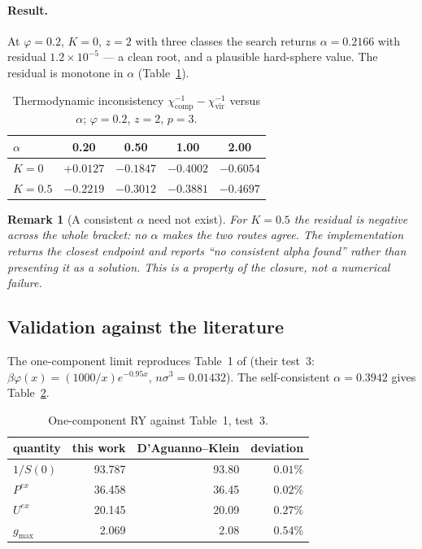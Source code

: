 \documentclass[11pt,a4paper]{article}
\newtheorem{remark}{Remark}
\begin{document}
\paragraph{Result.} At $\varphi=0.2$, $K=0$, $z=2$ with three classes the
search returns $\alpha=0.2166$ with residual $1.2\times10^{-5}$ --- a clean
root, and a plausible hard-sphere value. The residual is monotone in
$\alpha$ (Table~\ref{tab:alpha}).

\begin{table}[htbp]
\centering
\caption{Thermodynamic inconsistency
$\chi^{-1}_{\text{comp}}-\chi^{-1}_{\text{vir}}$ versus $\alpha$;
$\varphi=0.2$, $z=2$, $p=3$.}
\label{tab:alpha}
\begin{tabular}{lcccc}
\toprule
$\alpha$ & 0.20 & 0.50 & 1.00 & 2.00\\
\midrule
$K=0$   & $+0.0127$ & $-0.1847$ & $-0.4002$ & $-0.6054$\\
$K=0.5$ & $-0.2219$ & $-0.3012$ & $-0.3881$ & $-0.4697$\\
\bottomrule
\end{tabular}
\end{table}

\begin{remark}[A consistent $\alpha$ need not exist]
For $K=0.5$ the residual is negative across the whole bracket: no $\alpha$
makes the two routes agree. The implementation returns the closest endpoint
and reports ``no consistent alpha found'' rather than presenting it as a
solution. This is a property of the closure, not a numerical failure.
\end{remark}

\subsection{Validation against the literature}

The one-component limit reproduces Table~1 of \cite{DAguannoKlein1991}
(their test~3: $\beta\varphi(x)=(1000/x)e^{-0.95x}$, $n\sigma^3=0.01432$).
The self-consistent $\alpha=0.3942$ gives Table~\ref{tab:dk}.

\begin{table}[htbp]
\centering
\caption{One-component RY against \cite{DAguannoKlein1991} Table~1, test~3.}
\label{tab:dk}
\begin{tabular}{lrrr}
\toprule
quantity & this work & D'Aguanno--Klein & deviation\\
\midrule
$1/S(0)$   & 93.787 & 93.80 & $0.01\%$\\
$P^{ex}$   & 36.458 & 36.45 & $0.02\%$\\
$U^{ex}$   & 20.145 & 20.09 & $0.27\%$\\
$g_{\max}$ &  2.069 &  2.08 & $0.54\%$\\
\bottomrule
\end{tabular}
\end{table}
\end{document}
